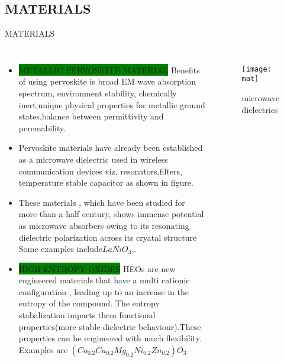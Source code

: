 \documentclass[11pt,aspect ratio=169]{beamer}
\begin{document}
\subsection{MATERIALS}
\begin{frame}{MATERIALS}
	\begin{columns}[T]
	\begin{itemize}
		\scriptsize
		\item \colorbox{green}{METALLIC PERVOSKITE MATERIAL} Benefits of using pervoskite is broad EM wave absorption spectrum, environment stability, chemically inert,unique physical properties for metallic ground states,balance between permittivity and peremability\cite{13}.
		\item Pervoskite materials have already been established as a microwave dielectric used in wireless communication devices viz. resonators,filters, temperature stable capacitor as shown in figure.
		\item These materials , which have been studied for more than a half century, shows immense potential as microwave absorbers owing to its resonating dielectric polarization across its cryatal structure Some examples include$LaNiO_3$,.
		\item \colorbox{green}{HIGH ENTROPY OXIDES} HEOs are new engineered materials that have a multi cationic configuration , leading up to an increase in the entropy of the compound. The entropy stabalization imparts them functional properties(more stable dielectric behaviour).These  properties can be engineered with much flexibility. Examples are $(Co_{0.2} Cu_{0.2} Mg_{0.2} Ni_{0.2} Zn_{0.2})O_3$ \cite{r15}
			\end{itemize}
		\begin{figure}[H]
			\centering
			\texttt{[image: mat]}
			\caption{microwave dielectrics \protect \cite{r14}}
			\label{fig:mat}
		\end{figure}
		
	\end{columns}
	\end{frame}
\end{document}
